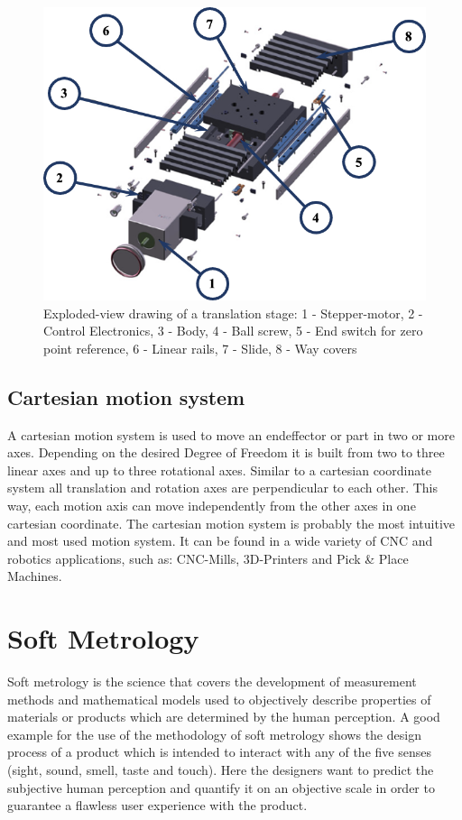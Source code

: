 \begin{figure}
\begin{center}
\includegraphics[width=12cm]{Pictures/LinearStage}
\caption[Exploded-view drawing of a translation stage]{Exploded-view drawing of a translation stage\cite{LoefflerLang2020}: 1 - Stepper-motor,  2 - Control Electronics, 3 - Body, 4 - Ball screw, 5 - End switch for zero point reference, 6 - Linear rails, 7 - Slide, 8 - Way covers}
\label{LinearStage}
\end{center}
\end{figure}

\subsection{Cartesian motion system}
A cartesian motion system is used to move an endeffector or part in two or more axes. Depending on the desired Degree of Freedom it is built from two to three linear axes and up to three rotational axes. Similar to a cartesian coordinate system all translation and rotation axes are perpendicular to each other. This way, each motion axis can move independently from the other axes in one cartesian coordinate. The cartesian motion system is probably the most intuitive and most used motion system. It can be found in a wide variety of CNC and robotics applications, such as: CNC-Mills, 3D-Printers and Pick \& Place Machines.\cite{Mareczek2020}


\section{Soft Metrology}
Soft metrology is the science that covers the development of measurement methods and mathematical models used to objectively describe properties of materials or products which are determined by the human perception. A good example for the use of the methodology of soft metrology shows the design process of a product which is intended to interact with any of the five senses (sight, sound, smell, taste and touch). Here the designers want to predict the subjective human perception and quantify it on an objective scale in order to guarantee a flawless user experience with the product.\cite{Eugene2008}

